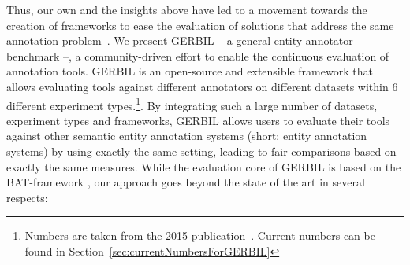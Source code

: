 Thus, our own and the insights above have led to a movement towards the creation of frameworks to ease the evaluation of solutions that address the same annotation problem~\cite{ERD2014,cornolti}. 
We present GERBIL -- a general entity annotator benchmark --, a community-driven effort to enable the continuous evaluation of annotation tools. 
GERBIL is an open-source and extensible framework that allows evaluating tools against  \overallGERBILannotators different annotators on \overalldatasets different datasets within 6 different experiment types.\footnote{Numbers are taken from the 2015 publication~\cite{GERBIL}. Current numbers can be found in Section~\ref{sec:currentNumbersForGERBIL}}. 
By integrating such a large number of datasets, experiment types and frameworks, GERBIL allows users to evaluate their tools against other semantic entity annotation systems (short: entity annotation systems) by using exactly the same setting, leading to fair comparisons based on exactly the same measures. 
While the evaluation core of GERBIL is based on the BAT-framework \cite{cornolti}, our approach goes beyond the state of the art in several respects:
